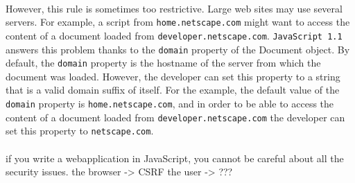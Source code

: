 \paragraph{}
However, this rule is sometimes too restrictive. Large web sites may use several servers. For example, a script from \texttt{home.netscape.com} might want to access the content of a document loaded from \texttt{developer.netscape.com}. \texttt{JavaScript 1.1} answers this problem thanks to the \texttt{domain} property of the Document object. By default, the \texttt{domain} property is the hostname of the server from which the document was loaded. However, the developer can set this property to a string that is a valid domain suffix of itself. For the example, the default value of the \texttt{domain} property is \texttt{home.netscape.com}, and in order to be able to access the content of a document loaded from \texttt{developer.netscape.com} the developer can set this property to \texttt{netscape.com}.


\paragraph{}
if you write a webapplication in JavaScript, you cannot be careful about all the security issues.
the browser -> CSRF
the user -> ???
